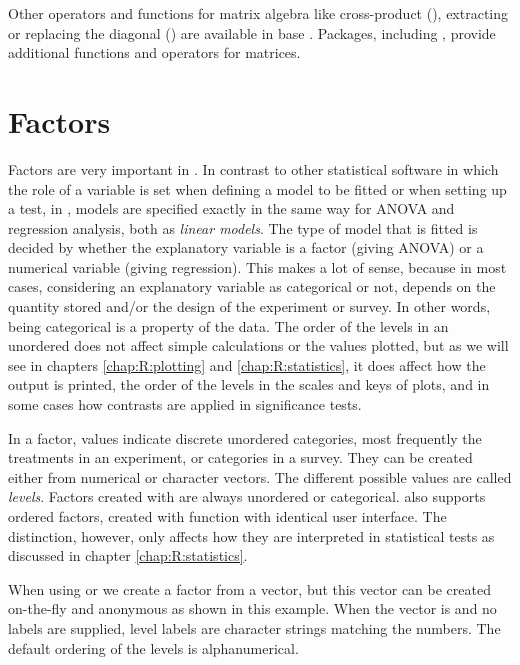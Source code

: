 \documentclass[krantz2]{krantz}\usepackage{knitr}
\begin{document}
Other operators and functions for matrix algebra like cross-product (), extracting or replacing the diagonal () are available in base \Rlang. Packages, including , provide additional functions and operators for matrices.




\section{Factors}\label{sec:calc:factors}
Factors are very important in \Rlang. In contrast to other statistical software in which the role of a variable is set when defining a model to be fitted or when setting up a test, in \Rlang, models are specified exactly in the same way for ANOVA and regression analysis, both as \emph{linear models}. The type of model that is fitted is decided by whether the explanatory variable is a factor (giving ANOVA) or a numerical variable (giving regression). This makes a lot of sense, because in most cases, considering an explanatory variable as categorical or not, depends on the quantity stored and/or the design of the experiment or survey. In other words, being categorical is a property of the data. The order of the levels in an unordered  does not affect simple calculations or the values plotted, but as we will see in chapters \ref{chap:R:plotting} and \ref{chap:R:statistics}, it does affect how the output is printed, the order of the levels in the scales and keys of plots, and in some cases how contrasts are applied in significance tests.

In a factor, values indicate discrete unordered categories, most frequently the treatments in an experiment, or categories in a survey. They can be created either from numerical or character vectors. The different possible values are called \emph{levels}. Factors created with  are always unordered or categorical. \Rlang also supports ordered factors, created with function  with identical user interface. The distinction, however, only affects how they are interpreted in statistical tests as discussed in chapter \ref{chap:R:statistics}. 

When using  or  we create a factor from a vector, but this vector can be created on-the-fly and anonymous as shown in this example. When the vector is  and no labels are supplied, level labels are character strings matching the numbers. The default ordering of the levels is alphanumerical.
\end{document}
